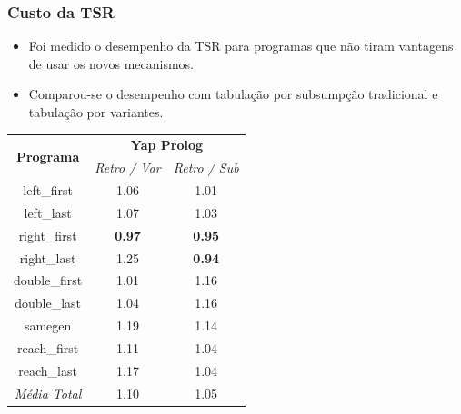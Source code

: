 \documentclass{beamer}
\begin{document}
\begin{frame}
   \frametitle{Custo da TSR}
   \begin{itemize}
      \item Foi medido o desempenho da TSR para programas que não tiram vantagens de usar os novos
      mecanismos.
      \item Comparou-se o desempenho com tabulação por subsumpção tradicional e tabulação por variantes.
   \end{itemize}
   \begin{center}
      {\footnotesize
     \begin{tabular}{ccc}
      \hline
       \hline
       \multirow{2}{*}{\textbf{Programa}} & \multicolumn{2}{c}{\textbf{Yap Prolog}} \\
       & \textit{\small{Retro / Var}} & \textit{\small{Retro / Sub}} \\
      \hline
      \hline
      left\_first & 1.06 & 1.01 \\
      left\_last &  1.07  & 1.03 \\
      right\_first & \textbf{0.97} & \textbf{0.95} \\
      right\_last & 1.25 & \textbf{0.94} \\
      double\_first & 1.01 & 1.16 \\
      double\_last & 1.04 & 1.16 \\
      samegen & 1.19 & 1.14 \\
      reach\_first  &  1.11  & 1.04 \\
      reach\_last  &  1.17  & 1.04 \\
   \hline
   \hline
   \textit{Média Total} &  1.10 &  1.05 \\
   \hline
   \hline
   \end{tabular}}
\end{center}
\end{frame}
\end{document}
